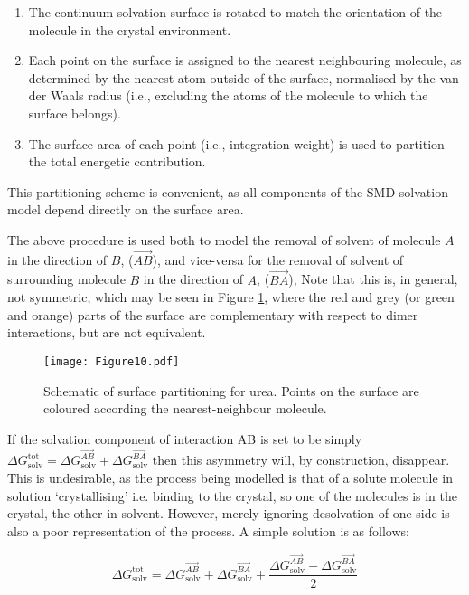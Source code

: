 \documentclass[twoside,twocolumn,9pt]{article}
\begin{document}
\begin{enumerate}
    \item The continuum solvation surface is rotated to match the orientation of the molecule in the
    crystal environment.
    \item Each point on the surface is assigned to the nearest neighbouring molecule, as determined
    by the nearest atom outside of the surface, normalised by the van der Waals radius (i.e., excluding the atoms of the molecule to which the surface belongs).
    \item The surface area of each point (i.e., integration weight) is used to partition the total
    energetic contribution.
\end{enumerate}

This partitioning scheme is convenient, as all components of the SMD solvation model depend directly 
on the surface area. 

The above procedure is used both to model the removal of solvent of molecule $A$ in the direction of $B$, ($\overrightarrow{AB}$), and vice-versa for the removal of solvent of surrounding molecule $B$ in the direction of $A$, ($\overrightarrow{BA}$), Note that this is, in general, not symmetric, which may be seen in Figure \ref{fig:solvent_partition}, where the red and grey (or green and orange) parts of the surface are complementary with respect to dimer interactions, but are not equivalent.

\begin{figure}
\centering
  \texttt{[image: Figure10.pdf]}
\caption{Schematic of surface partitioning for urea. Points on the surface are coloured according the nearest-neighbour molecule.}
\label{fig:solvent_partition}

\end{figure}

If the solvation component of interaction AB is set to be simply $\Delta G_{\text{solv}}^{\text{tot}} = \Delta G_{\text{solv}}^{\overrightarrow{AB}} + \Delta G_{\text{solv}}^{\overrightarrow{BA}}$
then this asymmetry will, by construction, disappear. This is undesirable, as the process being modelled is that of a solute molecule in solution ‘crystallising’ i.e. binding to the crystal, so one of the molecules is in the crystal, the other in solvent. However, merely ignoring desolvation of
one side is also a poor representation of the process. A simple solution is as follows:

\begin{equation}
    \Delta G_{\text{solv}}^{\text{tot}} = \Delta G_{\text{solv}}^{\overrightarrow{AB}} + \Delta G_{\text{solv}}^{\overrightarrow{BA}} + \frac{\Delta G_{\text{solv}}^{\overrightarrow{AB}} - \Delta G_{\text{solv}}^{\overrightarrow{BA}}}{2}
    \label{eqn:solvation_energy_partitioned}
\end{equation}
\end{document}
